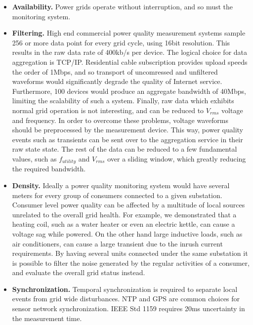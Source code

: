 \begin{itemize}
\item \textbf{Availability.} Power grids operate without interruption, and so must the monitoring system.

\item \textbf{Filtering.} High end commercial power quality measurement systems sample 256 or more data point for every grid cycle, using 16bit resolution. This results in the raw data rate of 400kb/s per device. The logical choice for data aggregation is TCP/IP. Residential cable  subscription provides upload speeds the order of 1Mbps, and so transport of uncomressed and unfiltered waveforms would significantly degrade the quality of Internet service. Furthermore, 100 devices would produce an aggregate bandwidth of 40Mbps, limiting the scalability of such a system. Finally, raw data which exhibits normal grid operation is not interesting, and can be reduced to $V_{rms}$ voltage and frequency. In order to overcome these problems, voltage waveforms should be preprocessed by the measurement device. This way, power quality events such as transients can be sent over to the aggregation service in their
raw state state. The rest of the data can be reduced to a few fundamental values, such as $f_{utility}$ and $V_{rms}$ over a sliding window, which greatly reducing the required bandwidth.

\item \textbf{Density.} Ideally a power quality monitoring system would have several meters for every group of consumers connected to a given
substation. Consumer level power quality can be affected by a multitude of local sources unrelated to the overall grid health. For example, we demonstrated that 
a heating coil, such as a water heater or even an electric kettle, can cause a voltage sag while powered. On the other hand large inductive loads, such as air conditioners, 
can cause a large transient due to the inrush current requirements. By having several units connected under the same substation it is possible to filter the noise generated
by the regular activities of a consumer, and evaluate the overall grid status instead.

\item \textbf{Synchronization.} Temporal synchronization is required to separate local events from grid wide disturbances.  NTP and GPS are common choices for sensor network synchronization. IEEE Std 1159 requires 20ms uncertainty in the measurement time.\cite{ieee_pq}

\end{itemize}

